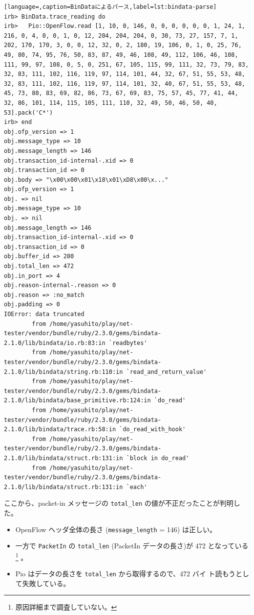 \begin{lstlisting}[language=,caption=BinDataによるパース,label=lst:bindata-parse]
irb> BinData.trace_reading do
irb>   Pio::OpenFlow.read [1, 10, 0, 146, 0, 0, 0, 0, 0, 0, 1, 24, 1, 216, 0, 4, 0, 0, 1, 0, 12, 204, 204, 204, 0, 30, 73, 27, 157, 7, 1, 202, 170, 170, 3, 0, 0, 12, 32, 0, 2, 180, 19, 106, 0, 1, 0, 25, 76, 49, 80, 74, 95, 76, 50, 83, 87, 49, 46, 108, 49, 112, 106, 46, 108, 111, 99, 97, 108, 0, 5, 0, 251, 67, 105, 115, 99, 111, 32, 73, 79, 83, 32, 83, 111, 102, 116, 119, 97, 114, 101, 44, 32, 67, 51, 55, 53, 48, 32, 83, 111, 102, 116, 119, 97, 114, 101, 32, 40, 67, 51, 55, 53, 48, 45, 73, 80, 83, 69, 82, 86, 73, 67, 69, 83, 75, 57, 45, 77, 41, 44, 32, 86, 101, 114, 115, 105, 111, 110, 32, 49, 50, 46, 50, 40, 53].pack('C*')
irb> end
obj.ofp_version => 1
obj.message_type => 10
obj.message_length => 146
obj.transaction_id-internal-.xid => 0
obj.transaction_id => 0
obj.body => "\x00\x00\x01\x18\x01\xD8\x00\x..."
obj.ofp_version => 1
obj. => nil
obj.message_type => 10
obj. => nil
obj.message_length => 146
obj.transaction_id-internal-.xid => 0
obj.transaction_id => 0
obj.buffer_id => 280
obj.total_len => 472
obj.in_port => 4
obj.reason-internal-.reason => 0
obj.reason => :no_match
obj.padding => 0
IOError: data truncated
        from /home/yasuhito/play/net-tester/vendor/bundle/ruby/2.3.0/gems/bindata-2.1.0/lib/bindata/io.rb:83:in `readbytes'
        from /home/yasuhito/play/net-tester/vendor/bundle/ruby/2.3.0/gems/bindata-2.1.0/lib/bindata/string.rb:110:in `read_and_return_value'
        from /home/yasuhito/play/net-tester/vendor/bundle/ruby/2.3.0/gems/bindata-2.1.0/lib/bindata/base_primitive.rb:124:in `do_read'
        from /home/yasuhito/play/net-tester/vendor/bundle/ruby/2.3.0/gems/bindata-2.1.0/lib/bindata/trace.rb:58:in `do_read_with_hook'
        from /home/yasuhito/play/net-tester/vendor/bundle/ruby/2.3.0/gems/bindata-2.1.0/lib/bindata/struct.rb:131:in `block in do_read'
        from /home/yasuhito/play/net-tester/vendor/bundle/ruby/2.3.0/gems/bindata-2.1.0/lib/bindata/struct.rb:131:in `each'
\end{lstlisting}

ここから、packet-in メッセージの \verb|total_len| の値が不正だったことが判明した。
\begin{itemize}
 \item OpenFlow ヘッダ全体の長さ (\verb|message_length| = 146) は正しい。
 \item 一方で \verb|PacketIn| の \verb|total_len| (PacketIn データの長さ)が
       472 となっている\footnote{原因詳細まで調査していない。} 。
 \item Pio はデータの長さを \verb|total_len| から取得するので、472 バイ
       ト読もうとして失敗している。
\end{itemize}

